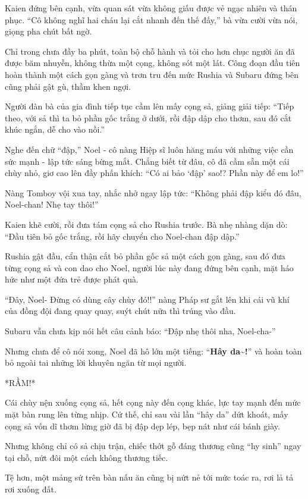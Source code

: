 \documentclass[../main.tex]{subfiles}
\begin{document}
Kaien đứng bên cạnh, vừa quan sát vừa không giấu được vẻ ngạc nhiên và thán phục. ``Cô không nghĩ hai cháu lại cắt nhanh đến thế đấy,'' bà vừa cười vừa nói, giọng pha chút bất ngờ.

Chỉ trong chưa đầy ba phút, toàn bộ chỗ hành và tỏi cho hơn chục người ăn đã được băm nhuyễn, không thừa một cọng, không sót một lát. Công đoạn đầu tiên hoàn thành một cách gọn gàng và trơn tru đến mức Rushia và Subaru đứng bên cũng phải gật gù, thầm khen ngợi.

Người đàn bà của gia đình tiếp tục cầm lên mấy cọng sả, giảng giải tiếp: ``Tiếp theo, với sả thì ta bỏ phần gốc trắng ở dưới, rồi đập dập cho thơm, sau đó cắt khúc ngắn, dễ cho vào nồi.''

Nghe đến chữ ``đập,'' Noel - cô nàng Hiệp sĩ luôn hăng máu với những việc cần sức mạnh - lập tức sáng bừng mắt. Chẳng biết từ đâu, cô đã cầm sẵn một cái chùy nhỏ, giơ cao lên đầy phấn khích: ``Có ai bảo `đập' sao!? Phần này để em lo!''

Nàng Tomboy vội xua tay, nhắc nhở ngay lập tức: ``Không phải đập kiểu đó đâu, Noel-chan! Nhẹ tay thôi!''

Kaien khẽ cười, rồi đưa tám cọng sả cho Rushia trước. Bà nhẹ nhàng dặn dò: ``Đầu tiên bỏ gốc trắng, rồi hãy chuyển cho Noel-chan đập dập.''

Rushia gật đầu, cẩn thận cắt bỏ phần gốc sả một cách gọn gàng, sau đó đưa từng cọng sả và con dao cho Noel, người lúc này đang đứng bên cạnh, mặt háo hức như một đứa trẻ được phát quà.

``Đây, Noel- Đừng có dùng cây chùy đó!!'' nàng Pháp sư gắt lên khi cái vũ khí của đồng đội đang quay quay, suýt chút nữa thì trúng vào đầu.

Subaru vẫn chưa kịp nói hết câu cảnh báo: ``Đập nhẹ thôi nha, Noel-cha-''

Nhưng chưa để cô nói xong, Noel đã hô lớn một tiếng: ``\textbf{Hây da\~{}!}'' và hoàn toàn bỏ ngoài tai những lời khuyên ngăn từ mọi người.

*RẦM!*

Cái chùy nện xuống cọng sả, hết cọng này đến cọng khác, lực tay mạnh đến mức mặt bàn rung lên từng nhịp. Cứ thế, chỉ sau vài lần ``hây da'' dứt khoát, mấy cọng sả vốn dĩ thơm lừng giờ đã bị đập dẹp lép, bẹp nát như cái bánh giày.

Nhưng không chỉ có sả chịu trận, chiếc thớt gỗ đáng thương cũng ``hy sinh'' ngay tại chỗ, nứt đôi một cách không thương tiếc.

Tệ hơn, một mảng sứ trên bàn nấu ăn cũng bị nứt nẻ tới mức toác ra, rơi lả tả rơi xuống đất.
\end{document}
